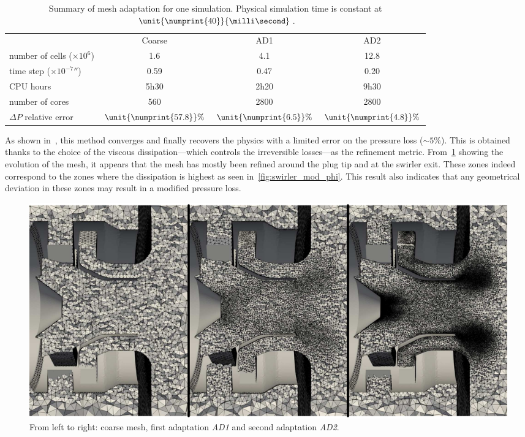 \begin{table}[!ht]
\centering
\caption{Summary of mesh adaptation for one simulation. Physical simulation time is constant at $\unit{\numprint{40}}{\milli\second}$.}
\begin{tabular}{lccc}
\toprule
 & Coarse & AD1 & AD2  \\
\cmidrule{2-4}
number of cells ($\times10^6$) & 1.6 & 4.1 & 12.8 \\
time step ($\unit{\times10^{-7}}{\second}$) & 0.59 & 0.47 & 0.20\\
CPU hours & 5h30 & 2h20 & 9h30 \\
number of cores & 560 & 2800 & 2800 \\
$\Delta P$ relative error & $\unit{\numprint{57.8}}{\%}$ & $\unit{\numprint{6.5}}{\%}$ & $\unit{\numprint{4.8}}{\%}$\\
\bottomrule
\end{tabular}
\label{tab:summary-mesh}
\end{table}

As shown in~\cite{Daviller2017}, this method converges and finally recovers the physics with a limited error on the pressure loss ($\sim 5$\%). This is obtained thanks to the choice of the viscous dissipation---which controls the irreversible losses---as the refinement metric. From~\cref{fig:mesh-AD-1-2} showing the evolution of the mesh, it appears that the mesh has mostly been refined around the plug tip and at the swirler exit. These zones indeed correspond to the zones where the dissipation is highest as seen in~\cref{fig:swirler_mod_phi}. This result also indicates that any geometrical deviation in these zones may result in a modified pressure loss. %

\begin{figure}[!ht]
\centering
\includegraphics[width=\linewidth,keepaspectratio]{fig/applications/swirler/mesh_init-AD_1-2.pdf}
\caption{From left to right: coarse mesh, first adaptation \emph{AD1} and second adaptation \emph{AD2}.}
\label{fig:mesh-AD-1-2}
\end{figure}


